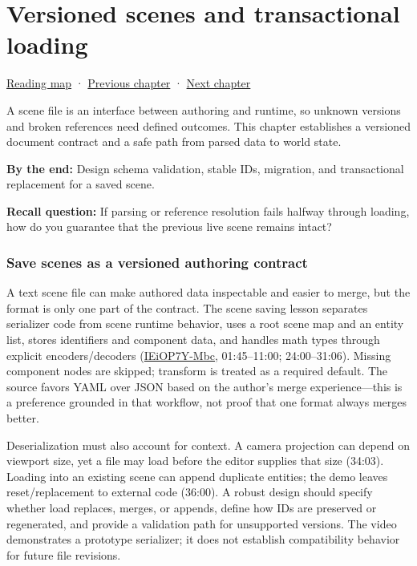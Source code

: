 \hypertarget{06-engine-ii-ch033}{}
\chapter{Versioned scenes and transactional loading}\label{06-engine-ii-ch033-versioned-scenes-and-transactional-loading}

\hyperref[volume-reading-map]{Reading map} · \hyperref[06-engine-ii-ch032-terrain-materials-and-image-composition]{Previous chapter} · \hyperref[06-engine-ii-ch034-rigid-body-motion-from-forces-to-contact]{Next chapter}

A scene file is an interface between authoring and runtime, so unknown versions and broken references need defined outcomes. This chapter establishes a versioned document contract and a safe path from parsed data to world state.

\textbf{By the end:} Design schema validation, stable IDs, migration, and transactional replacement for a saved scene.

\textbf{Recall question:} If parsing or reference resolution fails halfway through loading, how do you guarantee that the previous live scene remains intact?

\subsection{Save scenes as a versioned authoring contract}\label{06-engine-ii-ch033-save-scenes-as-a-versioned-authoring-contract}

A text scene file can make authored data inspectable and easier to merge, but the format is only one part of the contract. The scene saving lesson separates serializer code from scene runtime behavior, uses a root scene map and an entity list, stores identifiers and component data, and handles math types through explicit encoders/decoders (\href{https://www.youtube.com/watch?v=IEiOP7Y-Mbc}{IEiOP7Y-Mbc}, 01:45--11:00; 24:00--31:06). Missing component nodes are skipped; transform is treated as a required default. The source favors YAML over JSON based on the author's merge experience---this is a preference grounded in that workflow, not proof that one format always merges better.

Deserialization must also account for context. A camera projection can depend on viewport size, yet a file may load before the editor supplies that size (34:03). Loading into an existing scene can append duplicate entities; the demo leaves reset/replacement to external code (36:00). A robust design should specify whether load replaces, merges, or appends, define how IDs are preserved or regenerated, and provide a validation path for unsupported versions. The video demonstrates a prototype serializer; it does not establish compatibility behavior for future file revisions.

